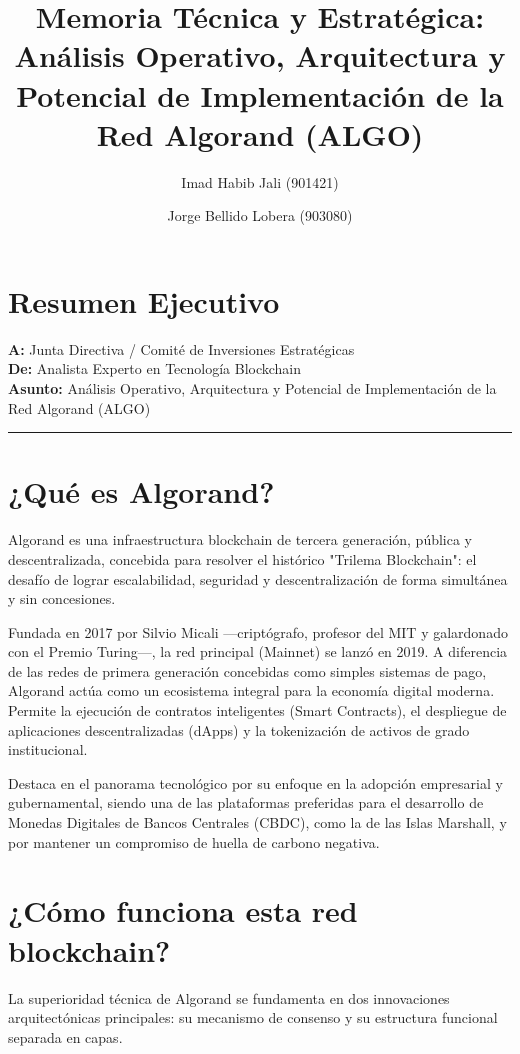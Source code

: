 \documentclass[12pt]{article}
\title{Memoria Técnica y Estratégica: Análisis Operativo, Arquitectura y Potencial de Implementación de la Red Algorand (ALGO)}
\author{Imad Habib Jali (901421) \and Jorge Bellido Lobera (903080)}
\date{}
\begin{document}
\maketitle

\section*{Resumen Ejecutivo}
\textbf{A:} Junta Directiva / Comité de Inversiones Estratégicas \\
\textbf{De:} Analista Experto en Tecnología Blockchain \\
\textbf{Asunto:} Análisis Operativo, Arquitectura y Potencial de Implementación de la Red Algorand (ALGO)

\noindent\rule{\textwidth}{0.4pt}

\section{¿Qué es Algorand?}

Algorand es una infraestructura blockchain de tercera generación, pública y descentralizada, concebida para resolver el histórico "Trilema Blockchain": el desafío de lograr escalabilidad, seguridad y descentralización de forma simultánea y sin concesiones. 

Fundada en 2017 por Silvio Micali ---criptógrafo, profesor del MIT y galardonado con el Premio Turing---, la red principal (Mainnet) se lanzó en 2019. A diferencia de las redes de primera generación concebidas como simples sistemas de pago, Algorand actúa como un ecosistema integral para la economía digital moderna. Permite la ejecución de contratos inteligentes (Smart Contracts), el despliegue de aplicaciones descentralizadas (dApps) y la tokenización de activos de grado institucional. 

Destaca en el panorama tecnológico por su enfoque en la adopción empresarial y gubernamental, siendo una de las plataformas preferidas para el desarrollo de Monedas Digitales de Bancos Centrales (CBDC), como la de las Islas Marshall, y por mantener un compromiso de huella de carbono negativa.

\section{¿Cómo funciona esta red blockchain?}

La superioridad técnica de Algorand se fundamenta en dos innovaciones arquitectónicas principales: su mecanismo de consenso y su estructura funcional separada en capas.
\end{document}
